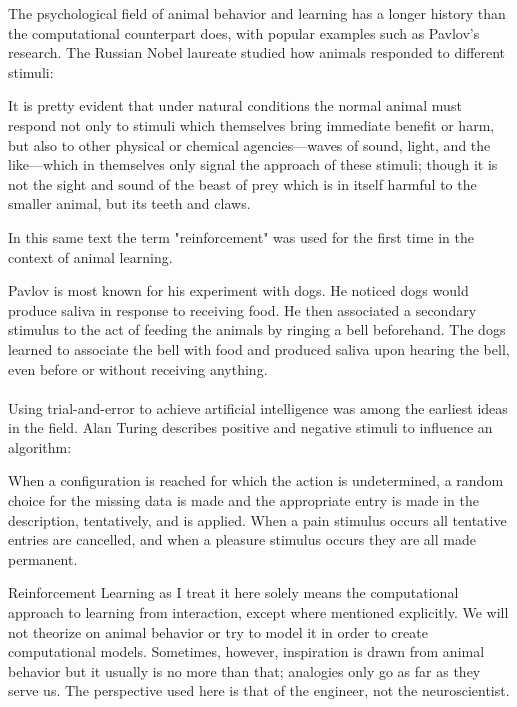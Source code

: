 The psychological field of animal behavior and learning
has a longer history than the computational counterpart does,
with popular examples such as Pavlov's research.
The Russian Nobel laureate studied how animals
responded to different stimuli:

\begin{displayquote}
It is pretty evident that under natural conditions the normal animal must
respond not only to stimuli which themselves bring immediate benefit or harm,
but also to other physical or chemical agencies—waves of sound,
light, and the like—which in themselves only signal the approach of these stimuli;
though it is not the sight and sound of the beast of prey
which is in itself harmful to the smaller animal, but its teeth and claws.
\end{displayquote}

In this same text the term "reinforcement"
was used for the first time in the context of animal learning.

Pavlov is most known for his experiment with dogs.
He noticed dogs would produce saliva in response
to receiving food.
He then associated a secondary stimulus to the act
of feeding the animals
by ringing a bell beforehand.
The dogs learned to associate the bell
with food and produced saliva
upon hearing the bell,
even before or without receiving anything.

\paragraph{}
Using trial-and-error to achieve artificial intelligence
was among the earliest ideas in the field.
Alan Turing describes positive and negative stimuli
to influence an algorithm:

\begin{displayquote}
  When a configuration is reached for which the action is undetermined, a
random choice for the missing data is made and the appropriate entry is
made in the description, tentatively, and is applied. When a pain stimulus
occurs all tentative entries are cancelled, and when a pleasure stimulus
occurs they are all made permanent.

\end{displayquote}

Reinforcement Learning as I treat it here
solely means the computational approach
to learning from interaction,
except where mentioned explicitly.
We will not theorize on animal behavior
or try to model it in order to create computational models.
Sometimes, however,
inspiration is drawn from animal behavior
but it usually is no more than that;
analogies only go as far as they serve us.
The perspective used here is that of the engineer,
not the neuroscientist.

